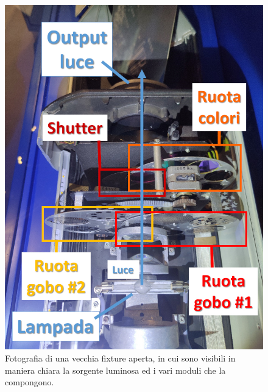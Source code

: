 \documentclass[main.tex]{subfiles}
\begin{document}
\begin{figure}[H]
    \centering
    \includegraphics[width=0.8\linewidth]{img/introduzione/fixtureModules.jpg}
    \caption{Fotografia di una vecchia fixture aperta, in cui sono visibili in maniera chiara la sorgente luminosa ed i vari moduli che la compongono.}
    \label{fig:1_FixtureModules}
\end{figure}

\end{document}

